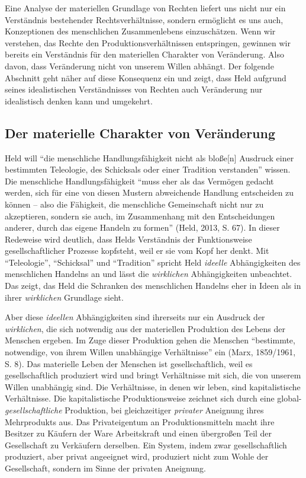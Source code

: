 \documentclass[ngerman,12pt, titlepage, smallheadings, nomath]{scrartcl}
\begin{document}
Eine Analyse der materiellen Grundlage von Rechten liefert uns nicht nur
ein Verständnis bestehender Rechtsverhältnisse, sondern ermöglicht es
uns auch, Konzeptionen des menschlichen Zusammenlebens einzuschätzen.
Wenn wir verstehen, das Rechte den Produktionsverhältnissen entspringen,
gewinnen wir bereits ein Verständnis für den materiellen Charakter von
Veränderung. Also davon, dass Veränderung nicht von unserem Willen
abhängt. Der folgende Abschnitt geht näher auf diese Konsequenz ein und
zeigt, dass Held aufgrund seines idealistischen Verständnisses von
Rechten auch Veränderung nur idealistisch denken kann und umgekehrt.

\subsection{Der materielle Charakter von
Veränderung}\label{der-materielle-charakter-von-veruxe4nderung}

Held will \enquote{die menschliche Handlungsfähigkeit nicht als
bloße{[}n{]} Ausdruck einer bestimmten Teleologie, des Schicksals oder
einer Tradition verstanden} wissen. Die menschliche Handlungsfähigkeit
\enquote{muss eher als das Vermögen gedacht werden, sich für eine von
diesen Mustern abweichende Handlung entscheiden zu können -- also die
Fähigkeit, die menschliche Gemeinschaft nicht nur zu akzeptieren,
sondern sie auch, im Zusammenhang mit den Entscheidungen anderer, durch
das eigene Handeln zu formen} (Held, 2013, S. 67). In dieser Redeweise
wird deutlich, dass Helds Verständnis der Funktionsweise
gesellschaftlicher Prozesse kopfsteht, weil er sie vom Kopf her denkt.
Mit \enquote{Teleologie}, \enquote{Schicksal} und \enquote{Tradition}
spricht Held \emph{ideelle} Abhängigkeiten des menschlichen Handelns an
und lässt die \emph{wirklichen} Abhängigkeiten unbeachtet. Das zeigt,
das Held die Schranken des menschlichen Handelns eher in Ideen als in
ihrer \emph{wirklichen} Grundlage sieht.

Aber diese \emph{ideellen} Abhängigkeiten sind ihrerseits nur ein
Ausdruck der \emph{wirklichen}, die sich notwendig aus der materiellen
Produktion des Lebens der Menschen ergeben. Im Zuge dieser Produktion
gehen die Menschen \enquote{bestimmte, notwendige, von ihrem Willen
unabhängige Verhältnisse} ein (Marx, 1859/1961, S. 8). Das materielle
Leben der Menschen ist gesellschaftlich, weil es gesellschaftlich
produziert wird und bringt Verhältnisse mit sich, die von unserem Willen
unabhängig sind. Die Verhältnisse, in denen wir leben, sind
kapitalistische Verhältnisse. Die kapitalistische Produktionsweise
zeichnet sich durch eine global-\emph{gesellschaftliche} Produktion, bei
gleichzeitiger \emph{privater} Aneignung ihres Mehrprodukts aus. Das
Privateigentum an Produktionsmitteln macht ihre Besitzer zu Käufern der
Ware Arbeitskraft und einen übergroßen Teil der Gesellschaft zu
Verkäufern derselben. Ein System, indem zwar gesellschaftlich
produziert, aber privat angeeignet wird, produziert nicht zum Wohle der
Gesellschaft, sondern im Sinne der privaten Aneignung.
\end{document}
